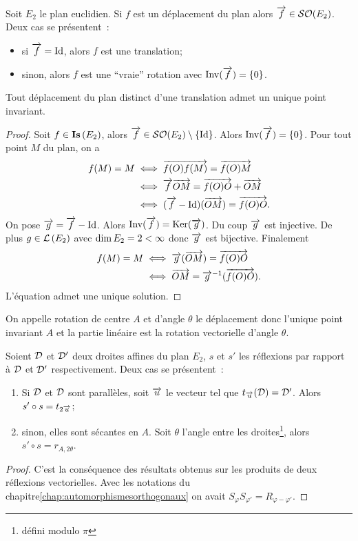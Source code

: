 Soit \(E_2\) le plan euclidien. Si \(f\) est un déplacement du plan alors 
\(\overrightarrow{f} \in \mathcal{SO}\!\left(E_2\right)\). Deux cas se présentent~:
\begin{itemize}
  \item si \(\overrightarrow{f} = \operatorname{Id}\), alors \(f\) est une translation;
  \item sinon, alors \(f\) est une ``vraie'' rotation avec 
    \(\operatorname{Inv}(\overrightarrow{f})=\{0\}\).
\end{itemize}
%
\begin{theo}
Tout déplacement du plan distinct d'une translation admet un unique point 
invariant. \end{theo}
\begin{proof}
  Soit \(f \in \mathbf{Is}\left(E_2\right)\), alors \(\overrightarrow{f}\in \mathcal{SO}\!\left(E_2\right)\setminus\{\operatorname{Id}\}\). 
  Alors \(\operatorname{Inv}(\overrightarrow{f})=\{0\}\). Pour tout point \(M\) du plan, on a
  \begin{align*}
    f(M)=M &\iff \overrightarrow{f(O)f(M)} = \overrightarrow{f(O)M} \\
    &\iff \overrightarrow{f}{\overrightarrow{OM}} = \overrightarrow{f(O)O} + \overrightarrow{OM} \\
    &\iff (\overrightarrow{f}-\operatorname{Id})(\overrightarrow{OM}) = \overrightarrow{f(O)O}.
  \end{align*}
  On pose \(\overrightarrow{g}=\overrightarrow{f}-\operatorname{Id}\). Alors \(\operatorname{Inv}(\overrightarrow{f})=\operatorname{Ker}(\overrightarrow{g})\). Du 
  coup \(\overrightarrow{g}\) est injective. De plus \(g \in \mathcal{L}\left(E_2\right)\) avec \(\operatorname{dim} 
  E_2=2 <\infty\) donc \(\overrightarrow{g}\) est bijective. Finalement
  \begin{align*}
    f(M)=M &\iff \overrightarrow{g}(\overrightarrow{OM}) = \overrightarrow{f(O)O} \\
    &\iff \overrightarrow{OM} = \overrightarrow{g}^{-1}(\overrightarrow{f(O)O}).
  \end{align*}
  L'équation admet une unique solution.
\end{proof}
\begin{defdef}
  On appelle rotation de centre \(A\) et d'angle \(\theta\) le déplacement donc 
  l'unique point invariant \(A\) et la partie linéaire est la rotation 
  vectorielle d'angle \(\theta\).
\end{defdef}
%
\begin{prop}
  Soient \(\mathcal{D}\) et \(\mathcal{D}'\) deux droites affines du plan \(E_2\), \(s\) et 
  \(s'\) les réflexions par rapport à \(\mathcal{D}\) et \(\mathcal{D}'\) respectivement. Deux 
  cas se présentent~:
  \begin{enumerate}
    \item Si \(\mathcal{D}\) et \(\mathcal{D}\) sont parallèles, soit \(\overrightarrow{u}\) le vecteur tel que 
      \(t_{\overrightarrow{u}}(\mathcal{D})=\mathcal{D}'\). Alors \(s'\circ s=t_{2\overrightarrow{u}}\);
    \item sinon, elles sont sécantes en \(A\). Soit \(\theta\) l'angle entre les 
      droites\footnote{défini modulo \(\pi\)}, alors \(s'\circ s=r_{A, 
      2\theta}\).
  \end{enumerate}
\end{prop}
\begin{proof}
  C'est la conséquence des résultats obtenus sur les produits de deux réflexions 
  vectorielles. Avec les notations du chapitre\ref{chap:automorphismesorthogonaux} on avait \(S_\varphi 
  S_{\varphi'}=R_{\varphi-\varphi'}\).
\end{proof}

